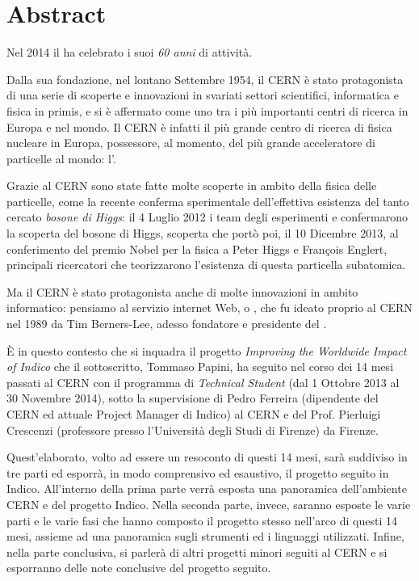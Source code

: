 \cleardoublepage
{}
\chapter*{Abstract}

	Nel 2014 il  ha celebrato i suoi \textit{60 anni} di attività.
	
	Dalla sua fondazione, nel lontano Settembre 1954, il \ac{CERN} è stato protagonista di una serie di scoperte e innovazioni in svariati settori scientifici, informatica e fisica in primis, e si è affermato come uno tra i più importanti centri di ricerca in Europa e nel mondo. Il \ac{CERN} è infatti il più grande centro di ricerca di fisica nucleare in Europa, possessore, al momento, del più grande acceleratore di particelle al mondo: l'.
	
	Grazie al \ac{CERN} sono state fatte molte scoperte in ambito della fisica delle particelle, come la recente conferma sperimentale dell'effettiva esistenza del tanto cercato \textit{bosone di Higgs}: il 4 Luglio 2012 i team degli esperimenti  e  confermarono la scoperta del bosone di Higgs, scoperta che portò poi, il 10 Dicembre 2013, al conferimento del premio Nobel per la fisica a Peter Higgs e François Englert, principali ricercatori che teorizzarono l'esistenza di questa particella subatomica.
	
	Ma il \ac{CERN} è stato protagonista anche di molte innovazioni in ambito informatico: pensiamo al servizio internet Web, o , che fu ideato proprio al \ac{CERN} nel 1989 da Tim Berners-Lee, adesso fondatore e presidente del .
	
	È in questo contesto che si inquadra il progetto \textit{Improving the Worldwide Impact of Indico} che il sottoscritto, Tommaso Papini, ha seguito nel corso dei 14 mesi passati al \ac{CERN} con il programma di \textit{Technical Student} (dal 1 Ottobre 2013 al 30 Novembre 2014), sotto la supervisione di Pedro Ferreira (dipendente del \ac{CERN} ed attuale Project Manager di Indico) al \ac{CERN} e del Prof. Pierluigi Crescenzi (professore presso l'Università degli Studi di Firenze) da Firenze.
	
	Quest'elaborato, volto ad essere un resoconto di questi 14 mesi, sarà suddiviso in tre parti ed esporrà, in modo comprensivo ed esaustivo, il progetto seguito in Indico. All'interno della prima parte verrà esposta una panoramica dell'ambiente \ac{CERN} e del progetto Indico. Nella seconda parte, invece, saranno esposte le varie parti e le varie fasi che hanno composto il progetto stesso nell'arco di questi 14 mesi, assieme ad una panoramica sugli strumenti ed i linguaggi utilizzati. Infine, nella parte conclusiva, si parlerà di altri progetti minori seguiti al \ac{CERN} e si esporranno delle note conclusive del progetto seguito.
	